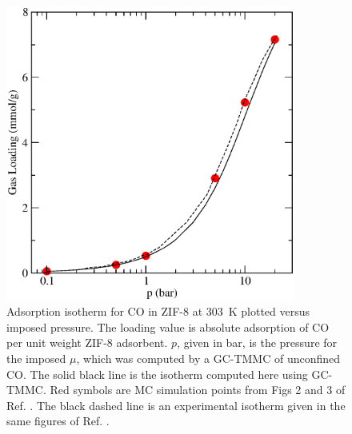 %
\begin{figure}
 \includegraphics[clip=true,width=0.85\textwidth]{Figures/ZIF8_CO2_Isotherm}
  \caption{Adsorption isotherm for CO in ZIF-8 at 303~K plotted versus imposed pressure. The loading value is absolute adsorption of CO per unit weight ZIF-8 adsorbent. $p$, given in bar, is the pressure for the imposed $\mu$, which was computed by a GC-TMMC of unconfined CO. The solid black line is the isotherm computed here using GC-TMMC. Red symbols are MC simulation points from Figs 2 and 3 of Ref. . The black dashed line is an experimental isotherm given in the same figures of Ref. .}
  \label{zif8_CO2_isotherm}
\end{figure}
%
